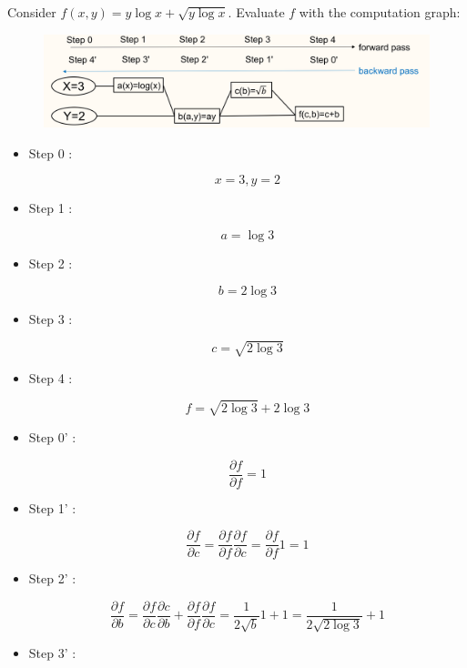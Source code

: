 \begin{example}
    Consider $f(x, y)=y \log x+\sqrt{y \log x}$. Evaluate $f$ with the computation graph:

    \begin{figure}[H]
        \centering
        \includegraphics[width=1.0\textwidth]{.././assets/6.12.png}
    \end{figure}

    \begin{itemize}
        \item
        Step 0 :

        $$
        x=3, y=2
        $$
        \item
        Step 1 :

        $$
        a=\log 3
        $$
        \item
        Step 2 :

        $$
        b=2 \log 3
        $$
        \item
        Step 3 :

        $$
        c=\sqrt{2 \log 3}
        $$
        \item
        Step 4 :

        $$
        f=\sqrt{2 \log 3}+2 \log 3
        $$
    \end{itemize}

    \par\noindent\textcolor{gray}{\hdashrule{\textwidth}{0.4pt}{1pt 2pt}}

    \begin{itemize}
        \item
        Step 0' :

        $$
        \frac{\partial f}{\partial f}=1
        $$
        \item
        Step 1' :

        $$
        \frac{\partial f}{\partial c}=\frac{\partial f}{\partial f} \frac{\partial f}{\partial c}=\frac{\partial f}{\partial f} 1=1
        $$
        \item
        Step 2' :

        $$
        \frac{\partial f}{\partial b}=\frac{\partial f}{\partial c} \frac{\partial c}{\partial b}+\frac{\partial f}{\partial f} \frac{\partial f}{\partial c}=\frac{1}{2 \sqrt{b}} 1+1=\frac{1}{2 \sqrt{2 \log 3}}+1
        $$
        \item
        Step 3' :


\end{itemize}
\end{example}
